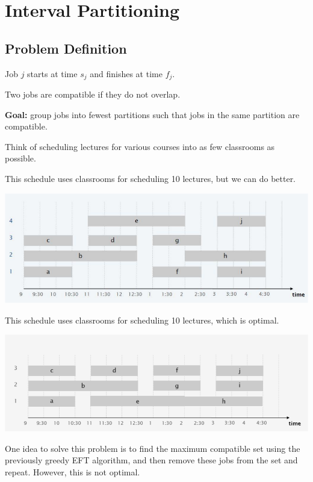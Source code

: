 \section{Interval Partitioning}

\subsection{Problem Definition}

\begin{listu}
    \item Job $j$ starts at time $s_j$ and finishes at time $f_j$.
    \item Two jobs are compatible if they do not overlap.
    \item \textbf{Goal:} group jobs into fewest partitions such that jobs in the same partition are compatible.
\end{listu}

\begin{example}
    Think of scheduling lectures for various courses into as few classrooms as possible.

    This schedule uses  classrooms for scheduling 10 lectures, but we can do better.

    \begin{center}
        \includegraphics[width=0.55\linewidth]{figures/interval-scheduling-4-classrooms.png}
    \end{center}

    This schedule uses  classrooms for scheduling 10 lectures, which is optimal.

    \begin{center}
        \includegraphics[width=0.55\linewidth]{figures/interval-scheduling-3-classrooms.png}
    \end{center}
\end{example}

One idea to solve this problem is to find the maximum compatible set using the previously greedy EFT algorithm, and then remove these jobs from the set and repeat. However, this is not optimal.


